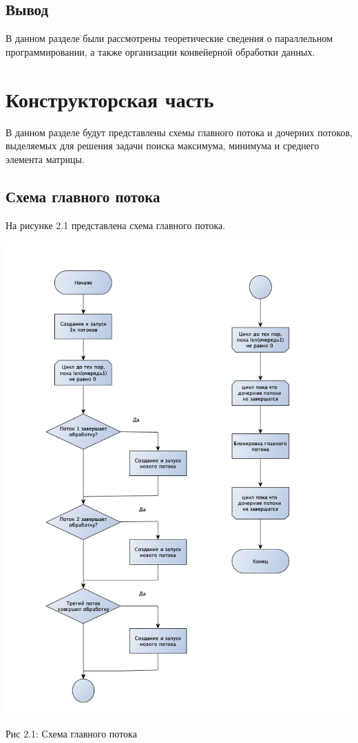 \documentclass[12pt]{report}
\begin{document}
\section{Вывод}

В данном разделе были рассмотрены теоретические сведения о параллельном программировании, а также организации конвейерной обработки данных.
 
\chapter{Конструкторская часть}

В данном разделе будут представлены схемы главного потока и дочерних потоков, выделяемых для решения задачи поиска максимума, минимума и среднего элемента матрицы.

\section{Схема главного потока}

На рисунке 2.1 представлена схема главного потока.

\begin{center}
		\includegraphics[scale=0.6]{MainThread.png}
		
			Рис 2.1: Схема главного потока
\end{center}
\end{document}
